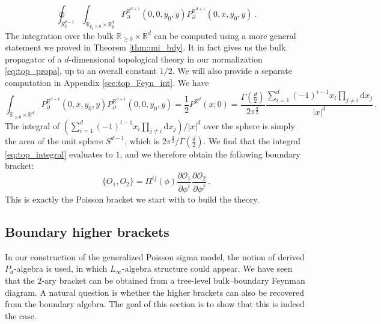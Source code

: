 \documentclass[11pt]{article}
\newcommand{\R}{\mathbb{R}}
\newcommand{\ddr}{\mathrm{d}}
\numberwithin{equation}{section}
\begin{document}
  \begin{equation}\label{eq:top_integral}
 	\oint_{S^{d-1}_x}\int_{\R_{y_0\geq 0}\times \R^d_y}P^{\R^{d+1}}_{\partial}(0,0,y_0,y)P^{\R^{d+1}}_{\partial}(0,x,y_0,y)\,.
 \end{equation}
The integration over the bulk $\R_{\geq 0}\times \R^d$ can be computed using a more general statement we proved in Theorem \ref{thm:uni_bdy}. It in fact gives us the bulk propagator of a $d$-dimensional topological theory in our normalization \eqref{eq:top_propa}, up to an overall constant $1/2$. We will also provide a separate computation in Appendix \ref{sec:top_Feyn_int}. We have 
 \begin{equation}
  \int_{\R_{\geq0}\times \R^d}P^{\R^{d+1}}_{\partial}(0,x,y_0,y)P^{\R^{d+1}}_{\partial}(0,0,y_0,y) = \frac{1}{2}P^{\R^d}(x;0) = \frac{\Gamma(\frac{d}{2})}{2\pi^{\frac{d}{2}}}\frac{\sum_{i=1}^d(-1)^{i-1}x_i\prod_{j\neq i}\ddr x_j}{|x|^d}\,.
 \end{equation}
The integral of $(\sum_{i=1}^d(-1)^{i-1}x_i\prod_{j\neq i}\ddr x_j)/|x|^{d}$ over the sphere is simply the area of the unit sphere $S^{d-1}$, which is $2\pi^{\frac{d}{2}}/\Gamma(\frac{d}{2})$. We find that the integral \eqref{eq:top_integral} evaluates to $1$, and we therefore obtain the following boundary bracket:
 \begin{equation}
 	\{O_1,O_2\} = \Pi^{ij}(\phi)\frac{\partial \mathcal{O}_1}{\partial \phi^i}\frac{\partial \mathcal{O}_2}{\partial \phi^j}\,.
 \end{equation}
 This is exactly the Poisson bracket we start with to build the theory.


\subsection{Boundary higher brackets}
\label{sec:bdy_higher}
In our construction of the generalized Poisson sigma model, the notion of derived $P_d$-algebra is used, in which $L_\infty$-algebra structure could appear. We have seen that the $2$-ary bracket can be obtained from a tree-level bulk–boundary Feynman diagram. A natural question is whether the higher brackets can also be recovered from the boundary algebra. The goal of this section is to show that this is indeed the case.
\end{document}
